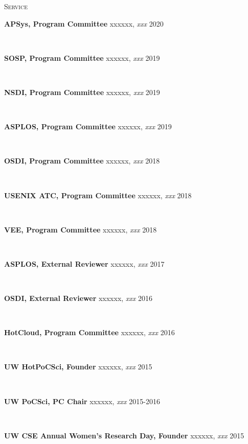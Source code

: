 \documentclass[10pt,times]{report}
\newlength{\sectiongap}
\newlength{\entrygap}
\newlength{\sectioncolwidth}
\newlength{\colgap}
\newlength{\stuffwidth}
\def\ifEqString#1#2{\def\testa{#1}\def\testb{#2}%
  \ifx\testa\testb}
\newenvironment{rtable}{
  \begin{minipage}{\textwidth}
  }{
  \end{minipage}
}
\newenvironment{rentry}[3][xxx]{
  \begin{minipage}[t]{\hsize}
    \textbf{#2}\ifEqString{#1}{xxx}\relax\else, \textit{#1}\fi
    \hspace{\stretch{1}} #3 \\
  }{
    \removelastskip
  \end{minipage}
  \\[\entrygap]  %
}
\newenvironment{rsection}[1]{
  \begin{minipage}[t]{\sectioncolwidth}
    \textsc{#1}
  \end{minipage}
  \hspace{\colgap}
  \begin{minipage}[t]{\stuffwidth}
  }{
    \removelastskip
  \end{minipage}
  \\[\sectiongap]
}
\begin{document}
\begin{rtable}
\begin{rsection}{Service}
\begin{rentry}{APSys, Program Committee}{2020}
    \end{rentry}
    \begin{rentry}{SOSP, Program Committee}{2019}
       \vspace{-0.5em}
    \end{rentry}
    \begin{rentry}{NSDI, Program Committee}{2019}
       \vspace{-0.5em}
    \end{rentry}
    \begin{rentry}{ASPLOS, Program Committee}{2019}
       \vspace{-0.5em}
    \end{rentry}
    \begin{rentry}{OSDI, Program Committee}{2018}
       \vspace{-0.5em}
    \end{rentry}
    \begin{rentry}{USENIX ATC, Program Committee}{2018}
       \vspace{-0.5em}
    \end{rentry}
    \begin{rentry}{VEE, Program Committee}{2018}
       \vspace{-0.5em}
    \end{rentry}
    \begin{rentry}{ASPLOS, External Reviewer}{2017}
       \vspace{-0.5em}
    \end{rentry}
    \begin{rentry}{OSDI, External Reviewer}{2016}
       \vspace{-0.5em}
    \end{rentry}
    \begin{rentry}{HotCloud, Program Committee}{2016}
       \vspace{-0.5em}
    \end{rentry}
    \begin{rentry}{UW HotPoCSci, Founder}{2015}
       \vspace{-0.5em}
    \end{rentry}
    \begin{rentry}{UW PoCSci, PC Chair}{2015-2016}
       \vspace{-0.5em}
    \end{rentry}
    \begin{rentry}{UW CSE Annual Women's Research Day, Founder}{2015}
       \vspace{-0.5em}
    \end{rentry}

\end{rsection}
\end{rtable}
\end{document}
